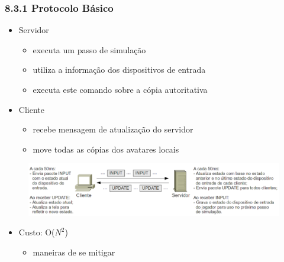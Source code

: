 \documentclass{beamer}
\begin{document}
\begin{frame}
  \frametitle{8.3.1 Protocolo Básico}
  \begin{itemize}
    \item Servidor
    \begin{itemize}
      \item executa um passo de simulação
      \item utiliza a informação dos dispositivos de entrada
      \item executa este comando sobre a cópia autoritativa
    \end{itemize}
  \end{itemize}
  \begin{itemize}
    \item Cliente
    \begin{itemize}
      \item recebe mensagem de atualização do servidor
      \item move todas as cópias dos avatares locais
    \end{itemize}
  \end{itemize}
  \begin{figure}[h]
    \centering
    \vspace{-18pt}
    \includegraphics[width=1.03\textwidth]{imagem_81.png}
    \vspace{-20pt}
  \end{figure}
  \begin{itemize}
    \item Custo: O($N^2$)
    \begin{itemize}
      \item maneiras de se mitigar
    \end{itemize}
  \end{itemize}
\end{frame}
\end{document}
